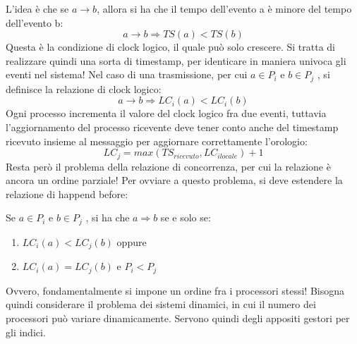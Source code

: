 L'idea è che se $a \rightarrow b$, allora si ha che il tempo dell'evento a è minore del tempo dell'evento b:
\begin{equation}
a \rightarrow b \Rightarrow T S(a) < T S(b) 
\end{equation}
Questa è la condizione di clock logico, il quale può solo crescere. Si tratta di realizzare quindi una sorta di
timestamp, per identicare in maniera univoca gli eventi nel sistema!
Nel caso di una trasmissione, per cui $a \in P_i$ e $b \in P_j$ , si definisce la relazione di clock logico:
\begin{equation}
a \rightarrow b \Rightarrow LC_i (a) < LC_i (b) 
\end{equation}
Ogni processo incrementa il valore del clock logico fra due eventi, tuttavia l'aggiornamento del processo ricevente
deve tener conto anche del timestamp ricevuto insieme al messaggio per aggiornare correttamente l'orologio:
\begin{equation}
 LC_j = max(TS_{ricevuto} , LC_{i locale}) + 1
\end{equation}
Resta però il problema della relazione di concorrenza, per cui la relazione è ancora un ordine parziale! Per ovviare
a questo problema, si deve estendere la relazione di happend before:

Se $a \in P_i$ e $b \in P_j$ , si ha che $a \Rightarrow b$ se e solo se:
\begin{enumerate}
 \item $LC_i (a) < LC_j (b)$ oppure
 \item $LC_i (a) = LC_j (b)$ e $P_i < P_j$
\end{enumerate}
Ovvero, fondamentalmente si impone un ordine fra i processori stessi! Bisogna quindi considerare il problema dei 
sistemi dinamici, in cui il numero dei processori può variare dinamicamente. Servono quindi degli appositi gestori 
per gli indici.

